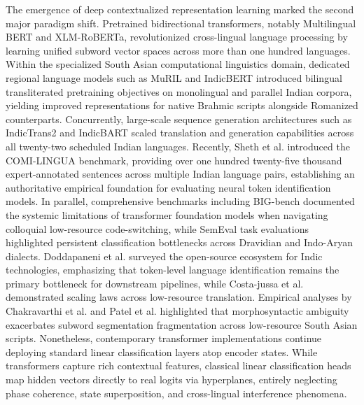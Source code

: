 \documentclass[10pt,twocolumn,letterpaper]{article}
\theoremstyle{definition}
\begin{document}
The emergence of deep contextualized representation learning marked the second major paradigm shift. Pretrained bidirectional transformers, notably Multilingual BERT and XLM-RoBERTa, revolutionized cross-lingual language processing by learning unified subword vector spaces across more than one hundred languages. Within the specialized South Asian computational linguistics domain, dedicated regional language models such as MuRIL and IndicBERT introduced bilingual transliterated pretraining objectives on monolingual and parallel Indian corpora, yielding improved representations for native Brahmic scripts alongside Romanized counterparts. Concurrently, large-scale sequence generation architectures such as IndicTrans2 and IndicBART scaled translation and generation capabilities across all twenty-two scheduled Indian languages. Recently, Sheth et al. introduced the COMI-LINGUA benchmark, providing over one hundred twenty-five thousand expert-annotated sentences across multiple Indian language pairs, establishing an authoritative empirical foundation for evaluating neural token identification models. In parallel, comprehensive benchmarks including BIG-bench documented the systemic limitations of transformer foundation models when navigating colloquial low-resource code-switching, while SemEval task evaluations highlighted persistent classification bottlenecks across Dravidian and Indo-Aryan dialects. Doddapaneni et al. surveyed the open-source ecosystem for Indic technologies, emphasizing that token-level language identification remains the primary bottleneck for downstream pipelines, while Costa-jussa et al. demonstrated scaling laws across low-resource translation. Empirical analyses by Chakravarthi et al. and Patel et al. highlighted that morphosyntactic ambiguity exacerbates subword segmentation fragmentation across low-resource South Asian scripts. Nonetheless, contemporary transformer implementations continue deploying standard linear classification layers atop encoder states. While transformers capture rich contextual features, classical linear classification heads map hidden vectors directly to real logits via hyperplanes, entirely neglecting phase coherence, state superposition, and cross-lingual interference phenomena.
\end{document}
